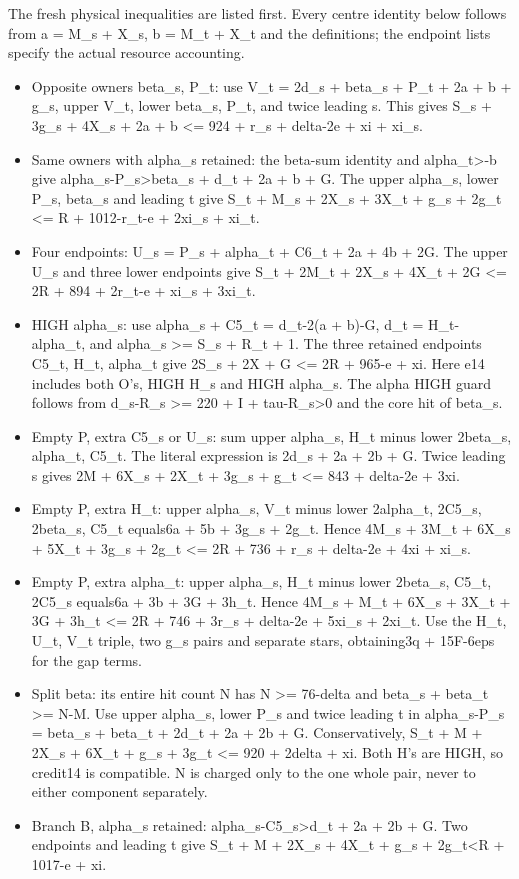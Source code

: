 \documentclass[11pt,a4paper]{article}
\newcommand{\tightlist}{\setlength{\itemsep}{0pt}\setlength{\parskip}{0pt}}
\begin{document}
The fresh physical inequalities are listed first. Every centre identity
below follows from a = M\_s + X\_s, b = M\_t + X\_t and the definitions;
the endpoint lists specify the actual resource accounting.

\begin{itemize}
\tightlist
\item
  Opposite owners beta\_s, P\_t: use V\_t = 2d\_s + beta\_s + P\_t + 2a
  + b + g\_s, upper V\_t, lower beta\_s, P\_t, and twice leading s. This
  gives S\_s + 3g\_s + 4X\_s + 2a + b \textless= 924 + r\_s + delta-2e +
  xi + xi\_s.
\item
  Same owners with alpha\_s retained: the beta-sum identity and
  alpha\_t\textgreater-b give alpha\_s-P\_s\textgreater beta\_s + d\_t +
  2a + b + G. The upper alpha\_s, lower P\_s, beta\_s and leading t give
  S\_t + M\_s + 2X\_s + 3X\_t + g\_s + 2g\_t \textless= R + 1012-r\_t-e
  + 2xi\_s + xi\_t.
\item
  Four endpoints: U\_s = P\_s + alpha\_t + C6\_t + 2a + 4b + 2G. The
  upper U\_s and three lower endpoints give S\_t + 2M\_t + 2X\_s + 4X\_t
  + 2G \textless= 2R + 894 + 2r\_t-e + xi\_s + 3xi\_t.
\item
  HIGH alpha\_s: use alpha\_s + C5\_t = d\_t-2(a + b)-G, d\_t =
  H\_t-alpha\_t, and alpha\_s \textgreater= S\_s + R\_t + 1. The three
  retained endpoints C5\_t, H\_t, alpha\_t give 2S\_s + 2X + G
  \textless= 2R + 965-e + xi. Here e14 includes both O's, HIGH H\_s and
  HIGH alpha\_s. The alpha HIGH guard follows from d\_s-R\_s
  \textgreater= 220 + I + tau-R\_s\textgreater0 and the core hit of
  beta\_s.
\item
  Empty P, extra C5\_s or U\_s: sum upper alpha\_s, H\_t minus lower
  2beta\_s, alpha\_t, C5\_t. The literal expression is 2d\_s + 2a + 2b +
  G. Twice leading s gives 2M + 6X\_s + 2X\_t + 3g\_s + g\_t \textless=
  843 + delta-2e + 3xi.
\item
  Empty P, extra H\_t: upper alpha\_s, V\_t minus lower 2alpha\_t,
  2C5\_s, 2beta\_s, C5\_t equals6a + 5b + 3g\_s + 2g\_t. Hence 4M\_s +
  3M\_t + 6X\_s + 5X\_t + 3g\_s + 2g\_t \textless= 2R + 736 + r\_s +
  delta-2e + 4xi + xi\_s.
\item
  Empty P, extra alpha\_t: upper alpha\_s, H\_t minus lower 2beta\_s,
  C5\_t, 2C5\_s equals6a + 3b + 3G + 3h\_t. Hence 4M\_s + M\_t + 6X\_s +
  3X\_t + 3G + 3h\_t \textless= 2R + 746 + 3r\_s + delta-2e + 5xi\_s +
  2xi\_t. Use the H\_t, U\_t, V\_t triple, two g\_s pairs and separate
  stars, obtaining3q + 15F-6eps for the gap terms.
\item
  Split beta: its entire hit count N has N \textgreater= 76-delta and
  beta\_s + beta\_t \textgreater= N-M. Use upper alpha\_s, lower P\_s
  and twice leading t in alpha\_s-P\_s = beta\_s + beta\_t + 2d\_t + 2a
  + 2b + G. Conservatively, S\_t + M + 2X\_s + 6X\_t + g\_s + 3g\_t
  \textless= 920 + 2delta + xi. Both H's are HIGH, so credit14 is
  compatible. N is charged only to the one whole pair, never to either
  component separately.
\item
  Branch B, alpha\_s retained: alpha\_s-C5\_s\textgreater d\_t + 2a + 2b
  + G. Two endpoints and leading t give S\_t + M + 2X\_s + 4X\_t + g\_s
  + 2g\_t\textless R + 1017-e + xi.
\end{itemize}
\end{document}
